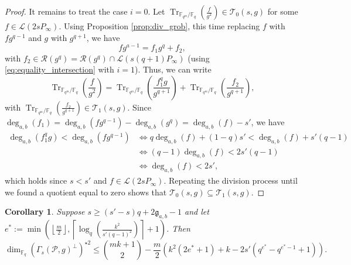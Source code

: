 \documentclass[a4paper]{article}
\newtheorem{coro}[thm]{Corollary}
\theoremstyle{definition}
\theoremstyle{remark}
\newcommand{\calP}{\mathcal{P}}
\newcommand{\calL}{\mathcal{L}}
\newcommand{\calR}{\mathcal{R}}
\newcommand{\calT}{\mathcal{T}}
\newcommand{\fq}{\mathbb{F}_{q}}
\newcommand{\Tr}[1]{\operatorname{Tr}_{\mathbb{F}_{q^m}/\fq}\left(#1\right)}
\newcommand{\degab}[1]{\deg_{a,b}\left(#1\right)}
\begin{document}
\begin{proof}
\noindent It remains to treat the case $i=0$. Let $\Tr{\frac{f}{g^2}} \in \calT_0(s,g)$ for some $f \in \calL(2sP_\infty)$. Using Proposition \ref{prop:div_grob}, this time replacing $f$ with $fg^{q-1}$ and $g$ with $g^{q+1}$, we have
$$fg^{a-1} = f_1g^q + f_2,$$ with $f_2 \in \calR(g^q) = \calR(g^q) \cap \calL(s(q+1)P_\infty)$ (using \eqref{eq:equality_intersection} with $i=1$).
Thus, we can write
    $$ \Tr{\frac{f}{g^2}} = \Tr{\frac{f_1^qg}{g^{q+1}}}  + \Tr{\frac{f_2}{g^{q+1}}}, $$
with $\Tr{\frac{f_2}{g^{q+1}}} \in \calT_1(s,g)$. Since $\degab{f_1} = \degab{fg^{q-1}} - \degab{g^q} = \degab{f}-s'$, we have 
\begin{align*}
     \degab{f_1^qg} < \degab{fg^{q-1}} & \iff q\degab{f} +(1-q)s' < \degab{f} + s'(q-1)\\
                                               & \iff (q-1)\degab{f} < 2s'(q-1)\\
                                               & \iff \degab{f} < 2s',
\end{align*}
which holds since $s<s'$ and $f \in \calL(2sP_\infty)$. Repeating the division process until we found a quotient equal to zero shows that $\calT_0(s,g) \subseteq \calT_1(s,g)$.
\end{proof}

\begin{coro} \label{coro:bound_with_T_i's_inclusion}
Suppose $s \geq (s'-s)q+2\mathfrak{g}_{a,b}-1$ and let $e^* := \min\left(\left\lfloor \frac{m}{2} \right\rfloor, \left\lceil \log_q\left(\frac{k^2}{s'(q-1)^2}\right)\right\rceil+1\right)$. Then
$$\dim_{\fq} (\Gamma_s(\calP,g)^{\perp})^{\star 2}\leq \binom{mk+1}{2} - \dfrac{m}{2}(k^2(2e^*+1)+k-2s'(q^{e^*}-q^{e^*-1}+1)). $$
\end{coro}
\end{document}
